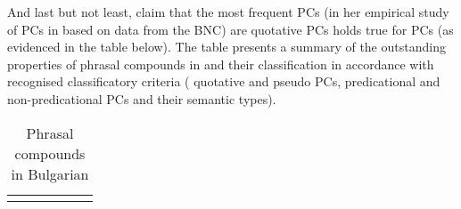 \documentclass[output=paper]{LSP/langsci}
\begin{document}
And last but not least,  claim that the most frequent PCs (in her empirical study of PCs in  based on data from the BNC) are quotative PCs holds true for  PCs (as evidenced in the table below). The table presents a summary of the outstanding properties of phrasal compounds in  and their classification in accordance with recognised classificatory criteria ( quotative and pseudo PCs,  predicational and non-predicational PCs and their semantic types).


\begin{sidewaystable}
\caption{Phrasal compounds in Bulgarian} 
\label{tab:bagasheva:2}
\footnotesize
\begin{tabularx}{\textwidth}{QQQQp{1.5cm}l}
\lsptoprule


\end{tabularx}
\end{sidewaystable}
\end{document}
